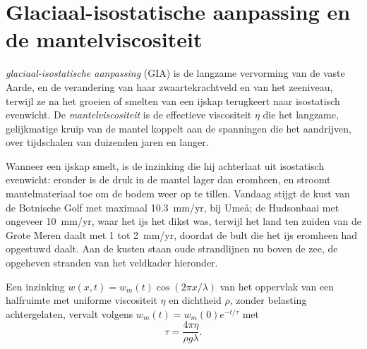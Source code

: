 \section{Glaciaal-isostatische aanpassing en de mantelviscositeit}\label{sec:b3:mantle-convection:gia}

\begin{definition}\label{def:b3:mantle-convection:gia}
\emph{glaciaal-isostatische aanpassing} (GIA)
is de langzame vervorming van de vaste Aarde, en de verandering van haar zwaartekrachtveld
en van het zeeniveau, terwijl ze na het groeien of smelten van een
ijskap terugkeert naar isostatisch evenwicht. De \emph{mantelviscositeit}
is de effectieve viscositeit $\eta$ die het langzame, gelijkmatige kruip van de
mantel koppelt aan de spanningen die het aandrijven, over tijdschalen van duizenden jaren en langer.
\end{definition}

Wanneer een ijskap smelt, is de inzinking die hij achterlaat uit isostatisch
evenwicht: eronder is de druk in de mantel lager dan eromheen, en
stroomt mantelmateriaal toe om de bodem weer op te tillen. Vandaag stijgt de kust van de Botnische Golf
met maximaal \qty{10.3}{mm/yr}, bij Umeå; de Hudsonbaai met ongeveer
\qty{10}{mm/yr}, waar het ijs het dikst was, terwijl het land ten zuiden van de
Grote Meren daalt met 1 tot \qty{2}{mm/yr}, doordat de bult die het ijs eromheen had opgestuwd
daalt. Aan de kusten staan oude strandlijnen nu boven de zee, de
opgeheven stranden van het veldkader hieronder.

\begin{theorem}\label{thm:b3:mantle-convection:relaxation}
Een inzinking $w(x, t) = w_m(t)\cos(2\pi x/\lambda)$ van het oppervlak van een
halfruimte met uniforme viscositeit $\eta$ en dichtheid $\rho$, zonder belasting achtergelaten,
vervalt volgens $w_m(t) = w_m(0)e^{-t/\tau}$ met
\[
  \tau = \frac{4\pi\eta}{\rho g\lambda} .
\]
\end{theorem}

